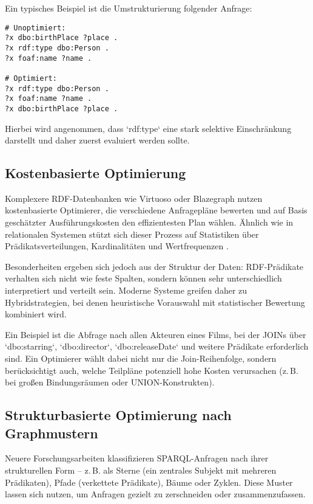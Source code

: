 \documentclass[12pt]{article}
\begin{document}
Ein typisches Beispiel ist die Umstrukturierung folgender Anfrage:

\begin{lstlisting}[caption=Unoptimierte vs. heuristisch optimierte Reihenfolge von Tripeln]
# Unoptimiert:
?x dbo:birthPlace ?place .
?x rdf:type dbo:Person .
?x foaf:name ?name .

# Optimiert:
?x rdf:type dbo:Person .
?x foaf:name ?name .
?x dbo:birthPlace ?place .
\end{lstlisting}

Hierbei wird angenommen, dass `rdf:type` eine stark selektive Einschränkung darstellt und daher zuerst evaluiert werden sollte.

\subsection{Kostenbasierte Optimierung}

Komplexere RDF-Datenbanken wie Virtuoso oder Blazegraph nutzen kostenbasierte Optimierer, die verschiedene Anfragepläne bewerten und auf Basis geschätzter Ausführungskosten den effizientesten Plan wählen. Ähnlich wie in relationalen Systemen stützt sich dieser Prozess auf Statistiken über Prädikatsverteilungen, Kardinalitäten und Wertfrequenzen \cite{sequeda2014cost}.

Besonderheiten ergeben sich jedoch aus der Struktur der Daten: RDF-Prädikate verhalten sich nicht wie feste Spalten, sondern können sehr unterschiedlich interpretiert und verteilt sein. Moderne Systeme greifen daher zu Hybridstrategien, bei denen heuristische Vorauswahl mit statistischer Bewertung kombiniert wird.

Ein Beispiel ist die Abfrage nach allen Akteuren eines Films, bei der JOINs über `dbo:starring`, `dbo:director`, `dbo:releaseDate` und weitere Prädikate erforderlich sind. Ein Optimierer wählt dabei nicht nur die Join-Reihenfolge, sondern berücksichtigt auch, welche Teilpläne potenziell hohe Kosten verursachen (z.\,B. bei großen Bindungsräumen oder UNION-Konstrukten).

\subsection{Strukturbasierte Optimierung nach Graphmustern}

Neuere Forschungsarbeiten klassifizieren SPARQL-Anfragen nach ihrer strukturellen Form – z.\,B. als Sterne (ein zentrales Subjekt mit mehreren Prädikaten), Pfade (verkettete Prädikate), Bäume oder Zyklen. Diese Muster lassen sich nutzen, um Anfragen gezielt zu zerschneiden oder zusammenzufassen.
\end{document}
